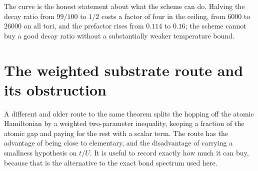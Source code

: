 \documentclass[11pt]{article}
\theoremstyle{plain}
\theoremstyle{definition}
\begin{document}
The curve is the honest statement about what the scheme can do. Halving the decay
ratio from $99/100$ to $1/2$ costs a factor of four in the ceiling, from $6000$ to
$26000$ on all tori, and the prefactor rises from $0.114$ to $0.16$; the scheme
cannot buy a good decay ratio without a substantially weaker temperature bound.

\section{The weighted substrate route and its obstruction}\label{sec:weighted}

A different and older route to the same theorem splits the hopping off the atomic
Hamiltonian by a weighted two-parameter inequality, keeping a fraction of the atomic
gap and paying for the rest with a scalar term. The route has the advantage of being
close to elementary, and the disadvantage of carrying a smallness hypothesis on
$t/U$. It is useful to record exactly how much it can buy, because that is the
alternative to the exact bond spectrum used here.
\end{document}
